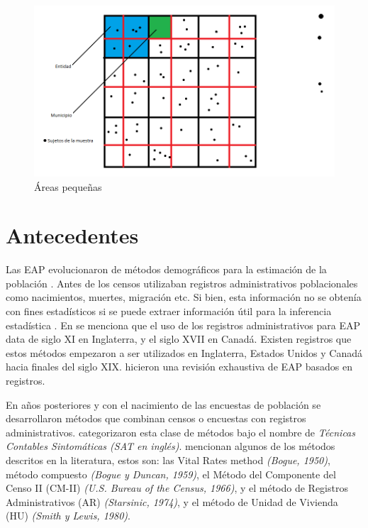 \documentclass[
  11pt,
  spanish,
  oneside]{book}
\begin{document}
\begin{figure}

{\centering \includegraphics[width=1\linewidth]{imagenes/Imagen 1.1} 

}

\caption{Áreas pequeñas}\label{fig:unnamed-chunk-1}
\end{figure}

\hypertarget{antecedentes}{%
\section*{Antecedentes}\label{antecedentes}}

Las EAP evolucionaron de métodos demográficos para la estimación de la población \citep[p.~55-93]{Gosh&Rao1994} \citep[p.~3]{Mancho2002}. Antes de los censos utilizaban registros administrativos poblacionales como nacimientos, muertes, migración etc. Si bien, esta información no se obtenía con fines estadísticos si se puede extraer información útil para la inferencia estadística \citep{Erciulescu2018}. En \citep{Brackstone1987} se menciona que el uso de los registros administrativos para EAP data de siglo XI en Inglaterra, y el siglo XVII en Canadá. Existen registros que estos métodos empezaron a ser utilizados en Inglaterra, Estados Unidos y Canadá hacia finales del siglo XIX. \citep{Zhang2016} hicieron una revisión exhaustiva de EAP basados en registros.

En años posteriores y con el nacimiento de las encuestas de población se desarrollaron métodos que combinan censos o encuestas con registros administrativos. \citep{Pursell1980} categorizaron esta clase de métodos bajo el nombre de \emph{Técnicas Contables Sintomáticas (SAT en inglés)}. \citep[p.~55-93]{Gosh&Rao1994} mencionan algunos de los métodos descritos en la literatura, estos son: las Vital Rates method \emph{(Bogue, 1950)}, método compuesto \emph{(Bogue y Duncan, 1959)}, el Método del Componente del Censo II (CM-II) \emph{(U.S. Bureau of the Census, 1966)}, y el método de Registros Administrativos (AR) \emph{(Starsinic, 1974)}, y el método de Unidad de Vivienda (HU) \emph{(Smith y Lewis, 1980)}.
\end{document}

